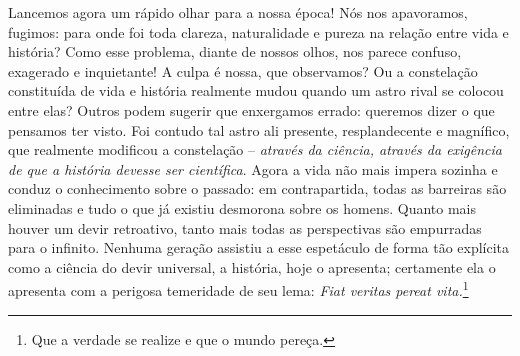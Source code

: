     Lancemos agora um rápido olhar para a nossa época! Nós nos
    apavoramos, fugimos: para onde foi toda clareza, naturalidade e
    pureza na relação entre vida e história? Como esse problema, diante
    de nossos olhos, nos parece confuso, exagerado e inquietante! A
    culpa é nossa, que observamos? Ou a constelação constituída de vida
    e história realmente mudou quando um astro rival se colocou entre
    elas? Outros podem sugerir que enxergamos errado: queremos dizer o
    que pensamos ter visto. Foi contudo tal astro ali presente,
    resplandecente e magnífico, que realmente modificou a constelação --
    \emph{através da ciência, através da exigência de que a história
    devesse ser científica}. Agora a vida não mais impera sozinha e
    conduz o conhecimento sobre o passado: em contrapartida, todas as
    barreiras são eliminadas e tudo o que já existiu desmorona sobre os
    homens. Quanto mais houver um devir retroativo, tanto mais todas as
    perspectivas são empurradas para o infinito. Nenhuma geração
    assistiu a esse espetáculo de forma tão explícita como a ciência do
    devir universal, a história, hoje o apresenta; certamente ela o
    apresenta com a perigosa temeridade de seu lema: \emph{Fiat veritas
    pereat vita.}\footnote{Que a verdade se realize e que o mundo pereça.}

